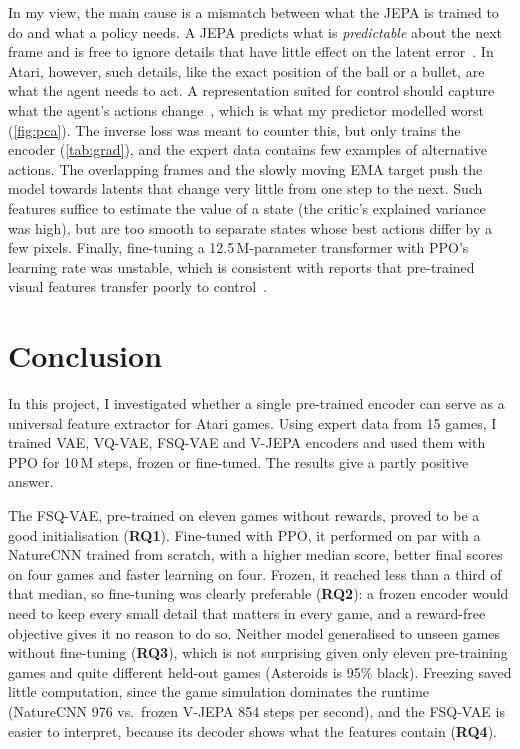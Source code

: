 \documentclass[runningheads]{llncs}
\begin{document}
In my view, the main cause is a mismatch between what the JEPA is trained to do and what a
policy needs. A JEPA predicts what is \emph{predictable} about the next frame and is free to
ignore details that have little effect on the latent error~\cite{lecun2022path,assran2023ijepa}.
In Atari, however, such details, like the exact position of the ball or a bullet, are what the
agent needs to act. A representation suited for control should
capture what the agent's actions change~\cite{gelada2019deepmdp}, which is what my predictor modelled worst (\cref{fig:pca}). The inverse loss was meant to counter this, but only trains the encoder (\cref{tab:grad}), and the expert data contains few examples of
alternative actions. The overlapping frames and the slowly moving EMA target push
the model towards latents that change very little from one step to the next. Such features suffice to estimate the value of a state (the critic's explained variance was high), but are too smooth to separate states whose best actions differ by a few pixels. Finally,
fine-tuning a 12.5\,M-parameter transformer with PPO's learning rate was unstable, which is
consistent with reports that pre-trained visual features transfer poorly to
control~\cite{hansen2022pretrained,parisi2022pvr}.

\FloatBarrier
\section{Conclusion}
\label{sec:conclusion}

In this project, I investigated whether a single pre-trained encoder can serve as a universal
feature extractor for Atari games. Using expert data from 15 games, I trained VAE, VQ-VAE,
FSQ-VAE and V-JEPA encoders and used them with PPO for 10\,M steps, frozen or fine-tuned.
The results give a partly positive answer.

The FSQ-VAE, pre-trained on eleven games without rewards, proved to be a good initialisation
(\textbf{RQ1}). Fine-tuned with PPO, it performed on par with a NatureCNN trained from scratch,
with a higher median score, better final scores on four games and faster learning on four.
Frozen, it reached less than a third of that median, so fine-tuning was clearly preferable
(\textbf{RQ2}): a frozen encoder would need to keep every small detail that matters in every
game, and a reward-free objective gives it no reason to do so. Neither model generalised to
unseen games without fine-tuning (\textbf{RQ3}), which is not surprising given only eleven
pre-training games and quite different held-out games (Asteroids is 95\% black). Freezing
saved little computation, since the game simulation dominates the runtime (NatureCNN 976 vs.\
frozen V-JEPA 854 steps per second), and the FSQ-VAE is easier to interpret, because its decoder
shows what the features contain (\textbf{RQ4}).
\end{document}
